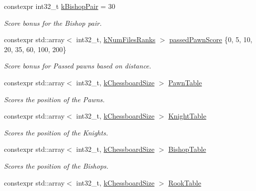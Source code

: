 \begin{DoxyCompactItemize}
constexpr int32\+\_\+t \mbox{\hyperlink{namespaceValue_a662b268cafa7fb0924985d533150c6c2}{k\+Bishop\+Pair}} = 30
\begin{DoxyCompactList}\small\item\em Score bonus for the Bishop pair. \end{DoxyCompactList}\item 
\mbox{\label{namespaceValue_aa30303e1cad8afe4b7ef7cf689ab2352}} 
constexpr std\+::array$<$ int32\+\_\+t, \mbox{\hyperlink{constants_8h_ab849322dfd3344623f425e94b416fc66}{k\+Num\+Files\+Ranks}} $>$ \mbox{\hyperlink{namespaceValue_aa30303e1cad8afe4b7ef7cf689ab2352}{passed\+Pawn\+Score}} \{0, 5, 10, 20, 35, 60, 100, 200\}
\begin{DoxyCompactList}\small\item\em Score bonus for Passed pawns based on distance. \end{DoxyCompactList}\item 
constexpr std\+::array$<$ int32\+\_\+t, \mbox{\hyperlink{constants_8h_a901d7bb0bf36a71e09079f9dd4168c4c}{k\+Chessboard\+Size}} $>$ \mbox{\hyperlink{namespaceValue_a8b6c72010096d1ae9eb653c5be418db0}{Pawn\+Table}}
\begin{DoxyCompactList}\small\item\em Scores the position of the Pawns. \end{DoxyCompactList}\item 
constexpr std\+::array$<$ int32\+\_\+t, \mbox{\hyperlink{constants_8h_a901d7bb0bf36a71e09079f9dd4168c4c}{k\+Chessboard\+Size}} $>$ \mbox{\hyperlink{namespaceValue_a4b65a409f1e288260d4e71d6c13376b5}{Knight\+Table}}
\begin{DoxyCompactList}\small\item\em Scores the position of the Knights. \end{DoxyCompactList}\item 
constexpr std\+::array$<$ int32\+\_\+t, \mbox{\hyperlink{constants_8h_a901d7bb0bf36a71e09079f9dd4168c4c}{k\+Chessboard\+Size}} $>$ \mbox{\hyperlink{namespaceValue_ab06336272528cf2e9e3772123f5eb5bb}{Bishop\+Table}}
\begin{DoxyCompactList}\small\item\em Scores the position of the Bishops. \end{DoxyCompactList}\item 
constexpr std\+::array$<$ int32\+\_\+t, \mbox{\hyperlink{constants_8h_a901d7bb0bf36a71e09079f9dd4168c4c}{k\+Chessboard\+Size}} $>$ \mbox{\hyperlink{namespaceValue_ae8066836a21ce4367ff232f08ce796a8}{Rook\+Table}}

\end{DoxyCompactItemize}
